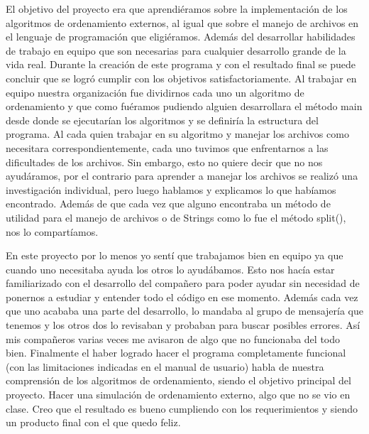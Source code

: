 \documentclass[letter]{report}
\begin{document}
El objetivo del proyecto era que aprendiéramos sobre la implementación de los algoritmos de ordenamiento externos, al igual que sobre el manejo de archivos en el lenguaje de programación que eligiéramos. Además del desarrollar habilidades de trabajo en equipo que son necesarias para cualquier desarrollo grande de la vida real. Durante la creación de este programa y con el resultado final se puede concluir que se logró cumplir con los objetivos satisfactoriamente. Al trabajar en equipo nuestra organización fue dividirnos cada uno un algoritmo de ordenamiento y que como fuéramos pudiendo alguien desarrollara el método main desde donde se ejecutarían los algoritmos y se definiría la estructura del programa. Al cada quien trabajar en su algoritmo y manejar los archivos como necesitara correspondientemente, cada uno tuvimos que enfrentarnos a las dificultades de los archivos. Sin embargo, esto no quiere decir que no nos ayudáramos, por el contrario para aprender a manejar los archivos se realizó una investigación individual, pero luego hablamos y explicamos lo que habíamos encontrado. Además de que cada vez que alguno encontraba un método de utilidad para el manejo de archivos o de Strings como lo fue el método split(), nos lo compartíamos.\medskip

En este proyecto por lo menos yo sentí que trabajamos bien en equipo ya que cuando uno necesitaba ayuda los otros lo ayudábamos. Esto nos hacía estar familiarizado con el desarrollo del compañero para poder ayudar sin necesidad de ponernos a estudiar y entender todo el código en ese momento. Además cada vez que uno acababa una parte del desarrollo, lo mandaba al grupo de mensajería que tenemos y los otros dos lo revisaban y probaban para buscar posibles errores. Así mis compañeros varias veces me avisaron de algo que no funcionaba del todo bien. Finalmente el haber logrado hacer el programa completamente funcional (con las limitaciones indicadas en el manual de usuario) habla de nuestra comprensión de los algoritmos de ordenamiento, siendo el objetivo principal del proyecto. Hacer una simulación de ordenamiento externo, algo que no se vio en clase. Creo que el resultado es bueno cumpliendo con los requerimientos y siendo un producto final con el que quedo feliz.


\nocite{*}
\printbibliography[title={Fuentes de información}]
\end{document}
